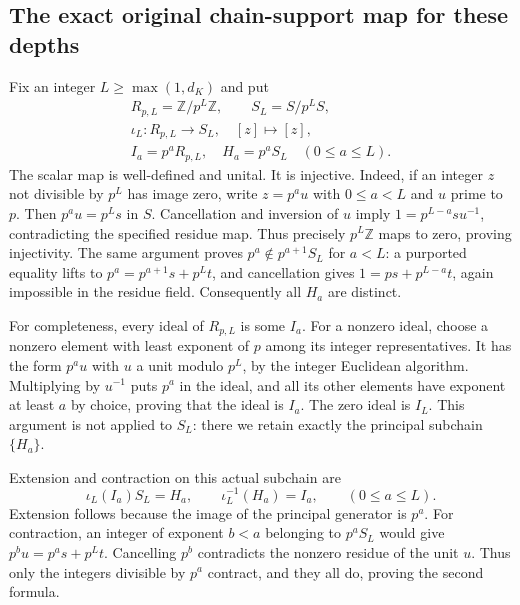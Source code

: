 \subsection{The exact original chain-support map for these depths}

Fix an integer \(L\geq\max(1,d_K)\) and put
\[
 \begin{gathered}
 R_{p,L}=\mathbb Z/p^L\mathbb Z,\qquad S_L=S/p^L S,\\
 \iota_L:R_{p,L}\longrightarrow S_L,
       \quad [z]\longmapsto[z],\\
 I_a=p^aR_{p,L},\quad H_a=p^aS_L\quad(0\leq a\leq L).
 \end{gathered}
 \tag{TCL.21}\label{eq:tcl-chain-rings}
\]
The scalar map is well-defined and unital. It is injective.
Indeed, if an integer \(z\) not divisible by \(p^L\) has image
zero, write \(z=p^a u\) with \(0\leq a<L\) and \(u\) prime
to \(p\). Then \(p^a u=p^L s\) in \(S\). Cancellation and
inversion of \(u\) imply \(1=p^{L-a}s u^{-1}\), contradicting
the specified residue map. Thus precisely \(p^L\mathbb Z\)
maps to zero, proving injectivity. The same argument proves
\(p^a\notin p^{a+1}S_L\) for \(a<L\): a purported equality
lifts to \(p^a=p^{a+1}s+p^L t\), and cancellation gives
\(1=p s+p^{L-a}t\), again impossible in the residue field.
Consequently all \(H_a\) are distinct.

For completeness, every ideal of \(R_{p,L}\) is some \(I_a\).
For a nonzero ideal, choose a nonzero element with least exponent
of \(p\) among its integer representatives. It has the form
\(p^a u\) with \(u\) a unit modulo \(p^L\), by the integer
Euclidean algorithm. Multiplying by \(u^{-1}\) puts \(p^a\)
in the ideal, and all its other elements have exponent at least
\(a\) by choice, proving that the ideal is \(I_a\). The zero
ideal is \(I_L\). This argument is not applied to \(S_L\):
there we retain exactly the principal subchain \(\{H_a\}\).

Extension and contraction on this actual subchain are
\[
 \iota_L(I_a)S_L=H_a,\qquad \iota_L^{-1}(H_a)=I_a,
 \qquad(0\leq a\leq L).
 \tag{TCL.22}\label{eq:tcl-extend-contract}
\]
Extension follows because the image of the principal generator is
\(p^a\). For contraction, an integer of exponent \(b<a\)
belonging to \(p^aS_L\) would give
\(p^b u=p^a s+p^L t\). Cancelling \(p^b\) contradicts the
nonzero residue of the unit \(u\). Thus only the integers divisible
by \(p^a\) contract, and they all do, proving the second formula.

